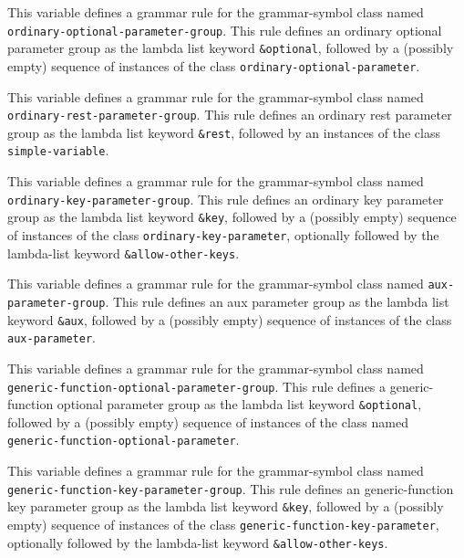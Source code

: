 
This variable defines a grammar rule for the grammar-symbol class
named \texttt{ordinary-optional-parameter-group}.  This rule defines
an ordinary optional parameter group as the lambda list keyword
\texttt{\&optional}, followed by a (possibly empty) sequence of
instances of the class \texttt{ordinary-optional-parameter}.


This variable defines a grammar rule for the grammar-symbol class
named \texttt{ordinary-rest-parameter-group}.  This rule defines an
ordinary rest parameter group as the lambda list keyword
\texttt{\&rest}, followed by an instances of the class
\texttt{simple-variable}.


This variable defines a grammar rule for the grammar-symbol class
named \texttt{ordinary-key-parameter-group}.  This rule defines
an ordinary key parameter group as the lambda list keyword
\texttt{\&key}, followed by a (possibly empty) sequence of
instances of the class \texttt{ordinary-key-parameter}, optionally
followed by the lambda-list keyword \texttt{\&allow-other-keys}.


This variable defines a grammar rule for the grammar-symbol class
named \texttt{aux-parameter-group}.  This rule defines an aux
parameter group as the lambda list keyword \texttt{\&aux}, followed by
a (possibly empty) sequence of instances of the class
\texttt{aux-parameter}.


This variable defines a grammar rule for the grammar-symbol class
named \texttt{generic-function-optional-parameter-group}.  This rule
defines a generic-function optional parameter group as the lambda list
keyword \texttt{\&optional}, followed by a (possibly empty) sequence
of instances of the class named\\
\texttt{generic-function-optional-parameter}.


This variable defines a grammar rule for the grammar-symbol class
named \texttt{generic-function-key-parameter-group}.  This rule
defines an generic-function key parameter group as the lambda list
keyword \texttt{\&key}, followed by a (possibly empty) sequence of
instances of the class \texttt{generic-function-key-parameter},
optionally followed by the lambda-list keyword
\texttt{\&allow-other-keys}.

